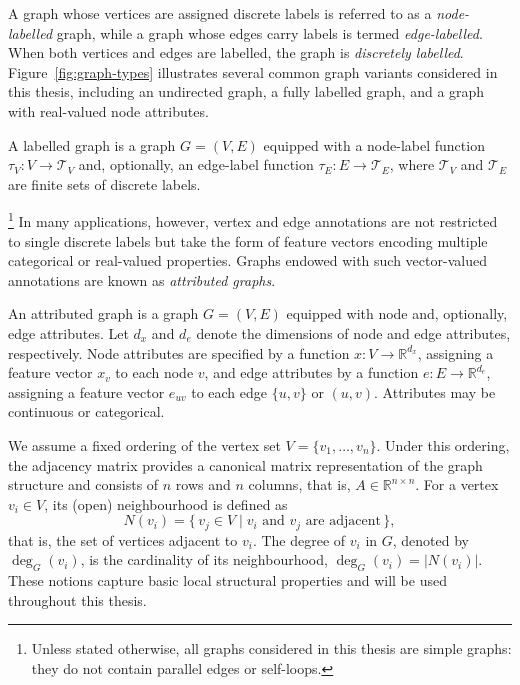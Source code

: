 A graph whose vertices are assigned discrete labels is referred to as a
\emph{node-labelled} graph, while a graph whose edges carry labels is termed
\emph{edge-labelled}. When both vertices and edges are labelled, the graph is
\emph{discretely labelled}. Figure~\ref{fig:graph-types} illustrates several common
graph variants considered in this thesis, including an undirected graph, a fully
labelled graph, and a graph with real-valued node attributes.

\begin{definition}
A labelled graph is a graph \(G=(V,E)\) equipped with a node-label function
\(\tau_V:V\to\mathcal{T}_V\) and, optionally, an edge-label function
\(\tau_E:E\to\mathcal{T}_E\), where \(\mathcal{T}_V\) and
\(\mathcal{T}_E\) are finite sets of discrete labels.
\end{definition}
\footnote{Unless stated otherwise, all graphs considered in this thesis are simple graphs: they do not contain parallel edges or self-loops.}
In many applications, however, vertex and edge annotations are not restricted to
single discrete labels but take the form of feature vectors encoding multiple
categorical or real-valued properties. Graphs endowed with such vector-valued
annotations are known as \emph{attributed graphs}.

\begin{definition}
 An attributed graph is a graph $G=(V,E)$
equipped with node and, optionally, edge attributes. Let $d_x$ and $d_e$ denote
the dimensions of node and edge attributes, respectively. Node attributes are
specified by a function $x: V \to \mathbb{R}^{d_x}$, assigning a feature vector
$x_v$ to each node $v$, and edge attributes by a function
$e: E \to \mathbb{R}^{d_e}$, assigning a feature vector $e_{uv}$ to each edge
\(\{u,v\}\) or \((u,v)\). Attributes may be continuous or categorical.
\end{definition} 
We assume a fixed ordering of the vertex set $V=\{v_1,\dots,v_n\}$.
Under this ordering, the adjacency matrix provides a canonical matrix
representation of the graph structure and consists of $n$ rows and $n$ columns,
that is, $A\in\mathbb{R}^{n\times n}$.
For a vertex $v_i\in V$, its (open) neighbourhood is defined as
\[
N(v_i)=\{\,v_j\in V \mid v_i \text{ and } v_j \text{ are adjacent}\,\},
\]
that is, the set of vertices adjacent to $v_i$.
The degree of $v_i$ in $G$, denoted by $\deg_G(v_i)$, is the cardinality of its
neighbourhood, $\deg_G(v_i)=|N(v_i)|$.
These notions capture basic local structural properties and will be used
throughout this thesis.

